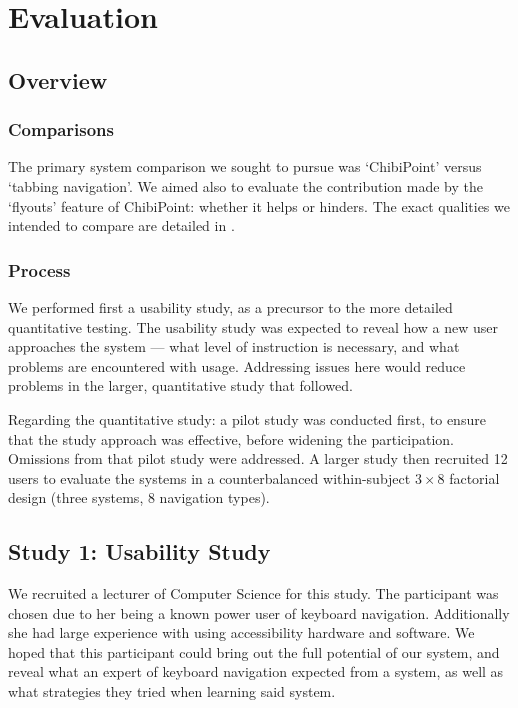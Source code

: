 \documentclass[11pt,openright,a4paper]{report}
\begin{document}
\chapter{Evaluation}
\label{chap:evaluation}
\section{Overview}
\subsection{Comparisons}
The primary system comparison we sought to pursue was `ChibiPoint' versus `tabbing navigation'. We aimed also to evaluate the contribution made by the `flyouts' feature of ChibiPoint: whether it helps or hinders. The exact qualities we intended to compare are detailed in .

\subsection{Process}
We performed first a usability study, as a precursor to the more detailed quantitative testing. The usability study was expected to reveal how a new user approaches the system --- what level of instruction is necessary, and what problems are encountered with usage. Addressing issues here would reduce problems in the larger, quantitative study that followed.

Regarding the quantitative study: a pilot study was conducted first, to ensure that the study approach was effective, before widening the participation. Omissions from that pilot study were addressed.
A larger study then recruited 12 users to evaluate the systems in a counterbalanced within-subject $3 \times 8$ factorial design (three systems, 8 navigation types).

\section{Study 1: Usability Study}
We recruited a lecturer of Computer Science for this study. The participant was chosen due to her being a known power user of keyboard navigation. Additionally she had large experience with using accessibility hardware and software. We hoped that this participant could bring out the full potential of our system, and reveal what an expert of keyboard navigation expected from a system, as well as what strategies they tried when learning said system.
\end{document}
